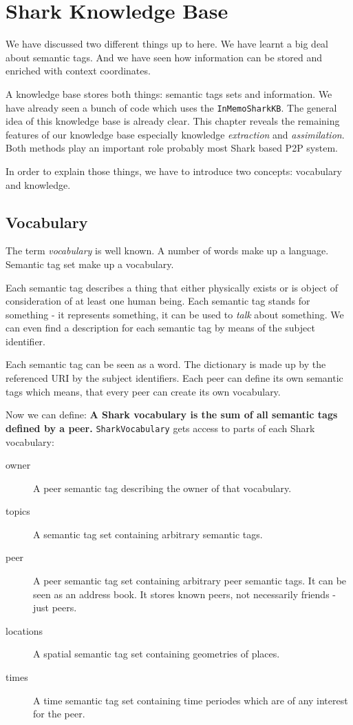 \chapter{Shark Knowledge Base}
\label{sec:sharkkb}
We have discussed two different things up to here. We have learnt a big deal about semantic tags. And we have seen how information can be stored and enriched with context coordinates.

A knowledge base stores both things: semantic tags sets and information. We have already seen a bunch of code which uses the {\tt InMemoSharkKB}. The general idea of this knowledge base is already clear. This chapter reveals the remaining features of our knowledge base especially knowledge {\it extraction} and {\it assimilation}. Both methods play an important role probably most Shark based P2P system.

In order to explain those things, we have to introduce two concepts: vocabulary and knowledge.

\section{Vocabulary}
The term {\it vocabulary} is well known. A number of words make up a language. Semantic tag set make up a vocabulary.

Each semantic tag describes a thing that either physically exists or is object of consideration of at least one human being. Each semantic tag stands for something - it represents something, it can be used to {\it talk} about something. We can even find a description for each semantic tag by means of the subject identifier.

Each semantic tag can be seen as a word. The dictionary is made up by the referenced URI by the subject identifiers. Each peer can define its own semantic tags which means, that every peer can create its own vocabulary.

Now we can define: {\bf A Shark vocabulary is the sum of all semantic tags defined by a peer.} {\tt SharkVocabulary} gets access to parts of each Shark vocabulary:

\begin{description}
\item[owner] A peer semantic tag describing the owner of that vocabulary.
\item[topics] A semantic tag set containing arbitrary semantic tags.
\item[peer] A peer semantic tag set containing arbitrary peer semantic tags.
It can be seen as an address book. It stores known peers, not necessarily friends - just peers.
\item[locations] A spatial semantic tag set containing geometries of places.
\item[times] A time semantic tag set containing time periodes which are of any interest for the peer.
\end{description}

